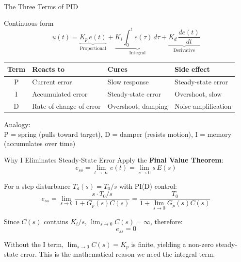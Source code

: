 \documentclass[10pt]{beamer}
\begin{document}
\begin{frame}{The Three Terms of PID}
  \begin{block}{Continuous form}
    \[
      u(t) = \underbrace{K_p\, e(t)}_{\text{Proportional}}
           + \underbrace{K_i \int_0^t e(\tau)\,d\tau}_{\text{Integral}}
           + \underbrace{K_d\, \frac{de(t)}{dt}}_{\text{Derivative}}
    \]
  \end{block}

  \footnotesize
  \begin{tabular}{c|p{3.2cm}|p{3.2cm}|p{2.5cm}}
    \toprule
    Term & Reacts to & Cures & Side effect \\
    \midrule
    P & Current error & Slow response & Steady-state error \\
    I & Accumulated error & Steady-state error & Overshoot, slow \\
    D & Rate of change of error & Overshoot, damping & Noise amplification \\
    \bottomrule
  \end{tabular}

  \vspace{0.4cm}
  Analogy:\\
  P = spring (pulls toward target),\quad
  D = damper (resists motion),\quad
  I = memory (accumulates over time)
\end{frame}

\begin{frame}{Why I Eliminates Steady-State Error}
  Apply the \textbf{Final Value Theorem}:
  \[
    e_{ss} = \lim_{t\to\infty} e(t) = \lim_{s\to 0} s\, E(s)
  \]

  For a step disturbance $T_d(s) = T_0/s$ with PI(D) control:
  \[
    e_{ss} = \lim_{s\to 0} \frac{s \cdot T_0/s}{1 + G_p(s)C(s)}
          = \frac{T_0}{1 + \lim_{s\to 0} G_p(s)C(s)}
  \]

  Since $C(s)$ contains $K_i/s$, $\lim_{s\to 0} C(s) = \infty$, therefore:
  \[
    \boxed{\; e_{ss} = 0 \;}
  \]

  \scriptsize
  Without the I term, $\lim_{s\to 0} C(s) = K_p$ is finite, yielding a non-zero steady-state error.
  This is the mathematical reason we need the integral term.
\end{frame}
\end{document}
